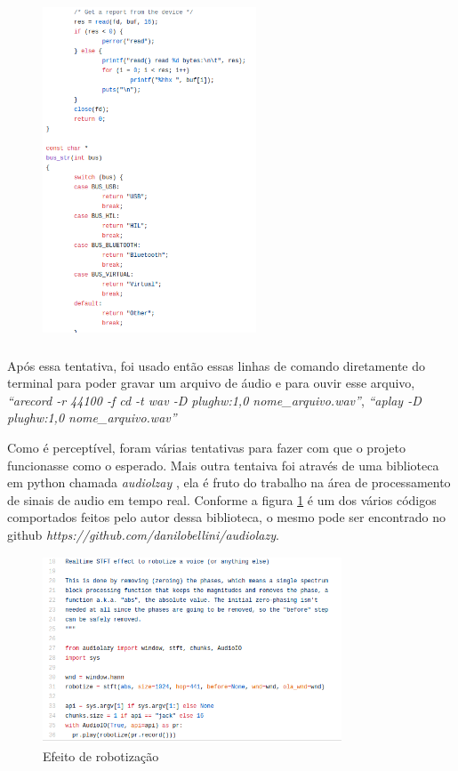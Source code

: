 \documentclass[conference]{IEEEtran}
\begin{document}
\begin{figure}[!htb]
\centering
\includegraphics[width=2.5in, height=4in]{Imagens/hid5}
\end{figure}

Após essa tentativa, foi usado então essas linhas de comando diretamente do terminal para poder gravar um arquivo de áudio e para ouvir esse arquivo, \textit{``arecord -r 44100 -f cd -t wav -D plughw:1,0 nome\_arquivo.wav''}, \textit{``aplay -D plughw:1,0 nome\_arquivo.wav''}  

Como é perceptível, foram várias tentativas para fazer com que o projeto funcionasse como o esperado. Mais outra tentaiva foi através de uma biblioteca em python chamada \textit{audiolzay} \cite{audiolazy}, ela é fruto do trabalho  na área de processamento de sinais de audio em tempo real. Conforme a figura \ref{robotizacao} é um dos vários códigos comportados feitos pelo autor dessa biblioteca, o mesmo pode ser encontrado no github \textit{https://github.com/danilobellini/audiolazy}. 


\begin{figure}[!htb]
\centering
\includegraphics[width=3.5in, height=2.2in]{Imagens/robotizacao}
\caption{Efeito de robotização} 
\label{robotizacao}
\end{figure}
\end{document}
